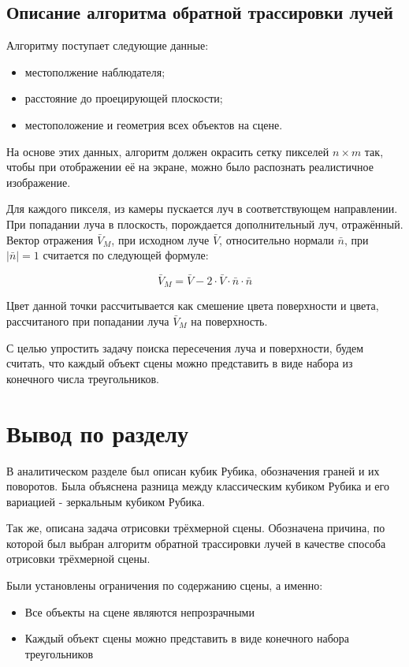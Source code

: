 \documentclass[a4paper, 14pt]{report}
\begin{document}
	\subsection{Описание алгоритма обратной трассировки лучей}
	Алгоритму поступает следующие данные:
	\begin{itemize}
		\item местополжение наблюдателя;
		\item расстояние до проецирующей плоскости;
		\item местоположение и геометрия всех объектов на сцене.
	\end{itemize}

	На основе этих данных, алгоритм должен окрасить сетку пикселей $n\times m$ так, чтобы при отображении её на экране, можно было распознать реалистичное изображение.
	
	Для каждого пикселя, из камеры пускается луч в соответствующем направлении. При попадании луча в плоскость, порождается дополнительный луч, отражённый. Вектор отражения $\bar V_M$, при исходном луче $\bar V$, относительно нормали $\bar n$, при $|\bar n| = 1$ считается по следующей формуле:
	
	\begin{equation}
		\bar V_M = \bar V - 2\cdot\bar V \cdot\bar n\cdot\bar n
		\label{eq:bounce}
	\end{equation}

	Цвет данной точки рассчитывается как смешение цвета поверхности и цвета, рассчитаного при попадании луча $\bar V_M$ на поверхность.
	
	С целью упростить задачу поиска пересечения луча и поверхности, будем считать, что каждый объект сцены можно представить в виде набора из конечного числа треугольников.
	
	\section{Вывод по разделу}
	В аналитическом разделе был описан кубик Рубика, обозначения граней и их поворотов. Была объяснена разница между классическим кубиком Рубика и его вариацией - зеркальным кубиком Рубика.
	
	Так же, описана задача отрисовки трёхмерной сцены. Обозначена причина, по которой был выбран алгоритм обратной трассировки лучей в качестве способа отрисовки трёхмерной сцены.
	
	Были установлены ограничения по содержанию сцены, а именно:
	\begin{itemize}
		\item Все объекты на сцене являются непрозрачными
		\item Каждый объект сцены можно представить в виде конечного набора треугольников
	\end{itemize}
		
\end{document}
